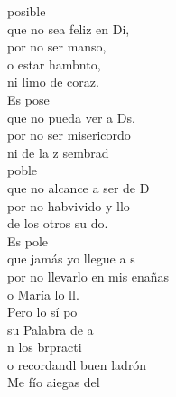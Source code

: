 \documentclass[12pt]{article}
\begin{document}
\begin{multicols*}{2}
\begin{cancion}%
	posible\\
	que no sea feliz en Di,\\
por no ser manso, \\
	o estar hambnto,\\
	ni limo de coraz.\\
	Es pose\\
	que no pueda ver a Ds,\\
	por no ser misericordo\\
	ni de la z sembrad\\
	 poble\\
	que no alcance a ser de D\\
	por no habvivido y llo\\
	de los otros su do.\\
	Es pole\\
	que jamás yo llegue a s\\
	por no llevarlo en mis enañas\\
	o María lo ll.\\
	Pero lo sí po \\
	su Palabra de a\\
	n los brpracti  \\
	o recordandl buen ladrón \\
	Me fío aiegas del\\
	         \\
\end{cancion}%


\end{multicols*}
\end{document}
